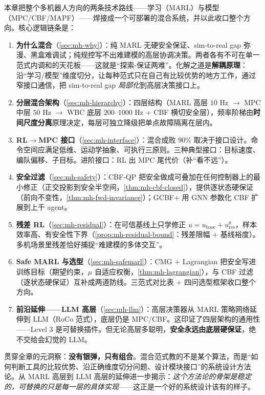本章把整个多机器人方向的两条技术路线——学习（MARL）与模型（MPC/CBF/MAPF）——焊接成一个可部署的混合系统，并以此收口整个方向。核心逻辑链条是：
\begin{enumerate}
  \item \textbf{为什么混合}（\cref{sec:mh-why}）：纯 MARL 无硬安全保证、sim-to-real gap 弥漫、黑盒难调试；纯规控写不出难建模的高层协调决策。两者各有不可在单一范式内调和的天花板——这就是“探索-保证两难”。化解之道是\textbf{解耦原理}：沿“学习/模型”维度切分，让每种范式只在自己有比较优势的地方工作，通过窄接口通信，把 sim-to-real gap \emph{局部化}到高层决策接口上。
  \item \textbf{分层混合架构}（\cref{sec:mh-hierarchy}）：四层结构（MARL 高层 $10$ Hz $\to$ MPC 中层 $50$ Hz $\to$ WBC 底层 $200$--$1000$ Hz $+$ CBF 横切安全层），频率阶梯由\textbf{时间尺度分离}原理决定，每层可独立降级把单点故障隔离在层内。
  \item \textbf{RL$\to$MPC 接口}（\cref{sec:mh-interface}）：混合成败 $90\%$ 取决于接口设计。命令空间应满足低维、运动学抽象、可执行三原则。三种典型接口：目标速度、编队偏移、子目标。进阶接口：RL 出 MPC 尾代价（补“看不远”）。
  \item \textbf{安全过滤}（\cref{sec:mh-safety}）：CBF-QP 把安全做成可叠加在任何控制器上的最小修正（正交投影到安全半空间，\cref{thm:mh-cbf-closed}），提供逐状态硬保证（前向不变性，\cref{thm:mh-fwd-invariance}）；GCBF+ 用 GNN 参数化 CBF 扩展到上千 agent。
  \item \textbf{残差 RL}（\cref{sec:mh-residual}）：在可信基线上只学修正 $u=u_{\text{base}}+u_{\text{res}}^{\theta}$，样本效率高、有安全性下界（\cref{prop:mh-residual-bound}：残差限幅 $+$ 基线裕度）。多机场景里残差恰好捕捉“难建模的多体交互”。
  \item \textbf{Safe MARL 与选型}（\cref{sec:mh-safemarl}）：CMG $+$ Lagrangian 把安全写进训练目标（期望约束，$\mu$ 自适应权衡，\cref{thm:mh-lagrangian}），与 CBF 过滤（逐状态硬保证）互补成两道防线。三范式对比表 $+$ 四问选型框架收口整个方向。
  \item \textbf{前沿延伸——LLM 高层}（\cref{sec:mh-llm}）：高层决策器从 MARL 策略网络延伸到 LLM（RoCo 范式），底层仍是 MPC/CBF。这印证了四层架构的通用性——Level 3 是可替换插件。但无论高层多聪明，\textbf{安全永远由底层硬保证}，绝不交给会幻觉的 LLM。
\end{enumerate}

\noindent 贯穿全章的元洞察：\textbf{没有银弹，只有组合}。混合范式教的不是某个算法，而是“如何判断工具的比较优势、沿正确维度切分问题、设计模块接口”的系统设计方法论。从 MARL 高层到 LLM 高层的延伸进一步揭示：\emph{这个方法论的骨架是稳定的，可替换的只是每一层的具体实现}——这正是一个好的系统设计该有的样子。

